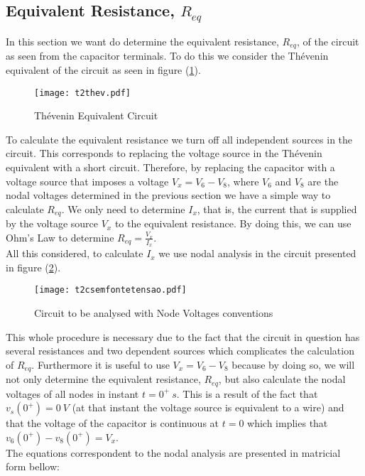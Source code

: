 \subsection{Equivalent Resistance, $R_{eq}$}
\label{sec:AnalEqRes}

In this section we want do determine the equivalent resistance, $R_{eq}$, of the circuit
as seen from the capacitor terminals. To do this we consider the Thévenin equivalent of
the circuit as seen in figure (\ref{fig:3}). 

\begin{figure}[H] \centering
  \texttt{[image: t2thev.pdf]}
  \caption{Thévenin Equivalent Circuit}
  \label{fig:3}
\end{figure}

To calculate the equivalent resistance we turn off all independent sources in the circuit. This 
corresponds to replacing the voltage source in the Thévenin equivalent with a short circuit.
Therefore, by replacing the capacitor with a voltage source that imposes a voltage $V_x = V_6 - V_8$, where
$V_6$ and $V_8$ are the nodal voltages determined in the previous section we have a simple way to calculate $R_{eq}$.
We only need to determine $I_x$, that is, the current that is supplied by the voltage source $V_x$ to the equivalent
resistance. By doing this, we can use Ohm's Law to determine $R_{eq} = \frac{V_x}{I_x}$.
\\
All this considered, to calculate $I_x$ we use nodal analysis in the circuit presented in figure (\ref{fig:4}).

\begin{figure}[H] \centering
  \texttt{[image: t2csemfontetensao.pdf]}
  \caption{Circuit to be analysed with Node Voltages conventions}
  \label{fig:4}
\end{figure} 

This whole procedure is necessary due to the fact that the circuit in question has several resistances and two dependent sources which complicates
the calculation of $R_{eq}$. Furthermore it is useful to use $V_x = V_6 - V_8$ because by doing so, we will not only determine the equivalent resistance, $R_{eq}$,
but also calculate the nodal voltages of all nodes in instant $t = 0^{+} \: s$. This is a result of the fact that
$v_s(0^{+}) = 0\: V$ (at that instant the voltage source is equivalent to a wire) and that the voltage of the capacitor is continuous at $t = 0$ which implies that $v_6(0^{+}) - v_8(0^{+}) = V_x$.
\\
The equations correspondent to the nodal analysis are presented in matricial form bellow:

